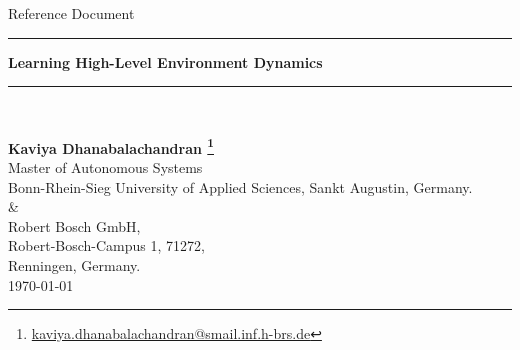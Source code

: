 \documentclass[12pt]{article}
\newcommand{\HRule}{\rule{\linewidth}{0.6mm}}
\begin{document}
\begin{titlepage}


\center %
 

\Large{Reference Document}\\[1.5cm] 
\HRule
{ \Large \bfseries Learning High-Level Environment Dynamics}\\\HRule \\[0.4cm]

\vspace*{1.5\baselineskip}
 
\normalsize{\bfseries Kaviya Dhanabalachandran
\footnote{\href{kaviya.dhanabalachandran@smail.inf.h-brs.de}{kaviya.dhanabalachandran@smail.inf.h-brs.de}}}\\[0.25cm]
{\normalsize Master of Autonomous Systems}\\[0.5cm] %
{\small Bonn-Rhein-Sieg University of Applied Sciences, Sankt
Augustin, Germany.}\\[0.05cm]
\&
\\[0.05cm]
{\small Robert Bosch GmbH,\\ Robert-Bosch-Campus 1, 71272,\\ Renningen, Germany.}\\[0.7cm]
\small{\today}\\[1,5cm]



\end{titlepage}
\end{document}

